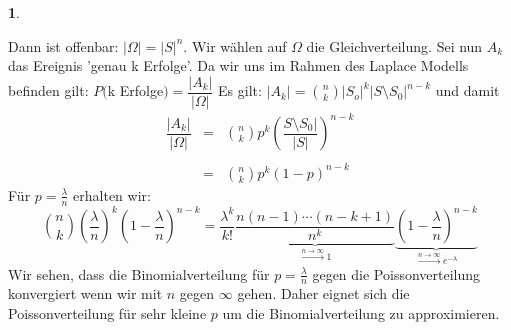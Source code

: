 \documentclass[10pt,a4paper]{report}
\numberwithin{equation}{section}
\numberwithin{figure}{section}
\theoremstyle{plain}
\theoremstyle{definition}
\newtheorem{example}[thm]{\protect\examplename}
\theoremstyle{remark}
\theoremstyle{plain}
\providecommand{\examplename}{Beispiel}
\newcommand{\1}{ \mathbb{1} } %
\begin{document}
\begin{example}
\begin{itemize}
    Dann ist offenbar: $|\Omega|=|S|^n$. Wir wählen auf $\Omega$ die Gleichverteilung. Sei nun $A_k$ das Ereignis 'genau k Erfolge'. Da wir uns im Rahmen des Laplace Modells befinden gilt:
    $P($k Erfolge$)=\dfrac{|A_k|}{|\Omega|}$
    Es gilt: $|A_k|=\binom{n}{k}|S_o|^k|S\setminus S_0|^{n-k}$ und
    damit
    \begin{eqnarray*}
      \dfrac{|A_k|}{|\Omega|}&=&\binom{n}{k}p^k\left(\dfrac{S\setminus S_0|}{|S|}\right)^{n-k}\\\\
      &=&\binom{n}{k}p^k(1-p)^{n-k}
    \end{eqnarray*}
    Für $p=\frac{\lambda}{n}$ erhalten wir:
    \[\binom{n}{k}\left(\dfrac{\lambda}{n}\right)^k\left(1-\dfrac{\lambda}{n}\right)^{n-k}=\dfrac{\lambda^k}{k!}\underbrace{\dfrac{n(n-1)\cdots(n-k+1)}{n^k}}_{\overset{n \to \infty}{\rightarrow} 1}\underbrace{\left(1-\dfrac{\lambda}{n}\right)^{n-k}}_{\overset{n \to \infty}{\rightarrow} e^{-\lambda}}\]
    Wir sehen, dass die Binomialverteilung für $p=\frac{\lambda}{n}$ gegen die Poissonverteilung konvergiert wenn wir mit $n$ gegen $\infty$ gehen. Daher eignet sich die Poissonverteilung für sehr kleine $p$ um die Binomialverteilung zu approximieren.
  \end{itemize}
\end{example}
\end{document}
